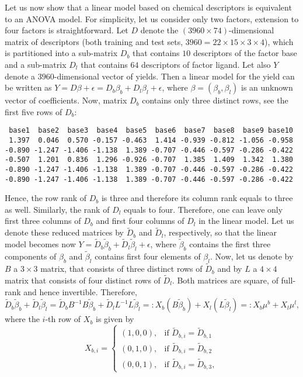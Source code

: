 \documentclass[12pt]{article}
\begin{document}
Let us now show that a linear model based on chemical descriptors is equivalent to an ANOVA model. For simplicity, let us consider only two factors, extension to four factors is straightforward. Let $D$ denote the $(3960\times 74)$-dimensional matrix of descriptors (both training and test sets, $3960=22\times 15\times 3\times4$), which is partitioned into a sub-matrix $D_b$ that contains $10$ descriptors of the factor {\color{blue} base} and a sub-matrix $D_l$ that contains $64$ descriptors of factor {\color{blue} ligand}. Let also $Y$ denote a $3960$-dimensional vector of yields. Then a linear model for the yield can be written as $Y=D\beta+\epsilon=D_b\beta_b+D_l\beta_l+\epsilon$, where $\beta=(\beta_b,\beta_l)$ is an unknown vector of coefficients. Now, matrix $D_b$ contains only three distinct rows, see the first five rows of $D_b$:
\begin{verbatim}
 base1  base2  base3  base4  base5  base6  base7  base8  base9 base10
 1.397  0.046  0.570 -0.157 -0.463  1.414 -0.939 -0.812 -1.056 -0.958
-0.890 -1.247 -1.406 -1.138  1.389 -0.707 -0.446 -0.597 -0.286 -0.422
-0.507  1.201  0.836  1.296 -0.926 -0.707  1.385  1.409  1.342  1.380
-0.890 -1.247 -1.406 -1.138  1.389 -0.707 -0.446 -0.597 -0.286 -0.422
-0.890 -1.247 -1.406 -1.138  1.389 -0.707 -0.446 -0.597 -0.286 -0.422
\end{verbatim}
Hence, the row rank of $D_b$ is three and therefore its column rank equals to three as well. Similarly, the rank of $D_l$ equals to four. Therefore, one can leave only first three columns of $D_b$ and first four columns of $D_l$ in the linear model. Let us denote these reduced matrices by $\widetilde{D}_b$ and $\widetilde{D}_l$, respectively, so that the linear model becomes now $Y=\widetilde{D}_b\widetilde{\beta}_b+\widetilde{D}_l\widetilde\beta_l+\epsilon$, where $\widetilde\beta_b$ contains the first three components of $\beta_b$ and $\widetilde\beta_l$ contains first four elements of $\beta_l$. Now, let us denote by $B$ a $3\times 3$ matrix, that consists of three distinct rows of $\widetilde{D}_b$ and by $L$ a $4\times 4$ matrix that consists of four distinct rows of $\widetilde{D}_l$. Both matrices are square, of full-rank and hence invertible. Therefore, 
$$
\widetilde{D}_b\widetilde{\beta}_b+\widetilde{D}_l\widetilde\beta_l=\widetilde{D}_bB^{-1}B\widetilde{\beta}_b+\widetilde{D}_lL^{-1}L\widetilde\beta_l=:X_b(B\widetilde\beta_b)+X_l(L\widetilde\beta_l)=:X_b\mu^b+X_l\mu^l,
$$
where the $i$-th row of $X_b$ is given by 
$$
X_{b,i}=\begin{cases}
	(1,0,0),&\mbox{if }\widetilde{D}_{b,i}=\widetilde{D}_{b,1}\\
	(0,1,0),&\mbox{if }\widetilde{D}_{b,i}=\widetilde{D}_{b,2}\\
	(0,0,1),&\mbox{if }\widetilde{D}_{b,i}=\widetilde{D}_{b,3},
\end{cases}
$$
\end{document}
